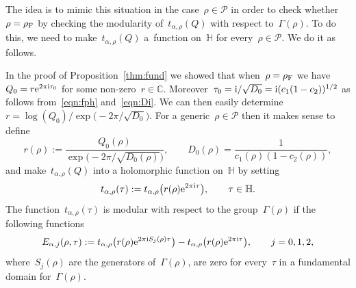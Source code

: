 \documentclass[pdftex]{sigma}
\newcommand{\C}{\mathbb{C}}
\newcommand{\Po}{\mathbb{H}}
\numberwithin{equation}{section}
\begin{document}
The idea is to mimic this situation in the case~$\rho\in\mathcal{P}$ in order to check whether~$\rho=\rho_{\rm F}$ by checking the modularity of~$t_{\alpha,\rho}(Q)$ with respect to~$\Gamma(\rho)$. To do this, we need to make~$t_{\alpha,\rho}(Q)$ a~function on~$\Po$ for every~$\rho\in\mathcal{P}$. We do it as follows.

In the proof of Proposition~\ref{thm:fund} we showed that when~$\rho=\rho_{\rm F}$ we have~$Q_0=r{\rm e}^{2\pi {\rm i}\tau_0}$ for some non-zero~$r\in\C$. Moreover~$\tau_0={\rm i}/\sqrt{D_0}={\rm i} (c_1(1-c_2) )^{1/2}$ as follows from~\eqref{eqn:fph} and~\eqref{eqn:Di}. We can then easily determine~$r=\log(Q_0)/\exp\big({-}2\pi/\sqrt{D_0}\big)$.
For a generic~$\rho\in\mathcal{P}$ then it makes sense to define
\begin{equation*}%
r(\rho):=\frac{Q_0(\rho)}{\exp\big({-}2\pi/\sqrt{D_0(\rho)}\big)},\qquad D_0(\rho)=\frac{1}{c_1(\rho) (1-c_2(\rho) )},
\end{equation*}
and make~$t_{\alpha,\rho}(Q)$ into a holomorphic function on~$\Po$ by setting
\[
t_{\alpha,\rho}(\tau):=t_{\alpha,\rho}\bigl(r(\rho){\rm e}^{2\pi {\rm i}\tau}\bigr) ,\qquad \tau\in\Po .
\]
The function~$t_{\alpha,\rho}(\tau)$ is modular with respect to the group~$\Gamma(\rho)$ if the following functions
\begin{equation}
\label{eqn:modfin}
E_{\alpha,j}(\rho,\tau):=t_{\alpha,\rho}\bigl(r(\rho) {\rm e}^{2\pi {\rm i}S_j(\rho)\tau}\bigr)-t_{\alpha,\rho}\bigl(r(\rho){\rm e}^{2\pi {\rm i}\tau}\bigr),\qquad j=0,1,2 ,
\end{equation}
where~$S_j(\rho)$ are the generators of~$\Gamma(\rho)$, are zero for every~$\tau$ in a fundamental domain for~$\Gamma(\rho)$.
\end{document}
